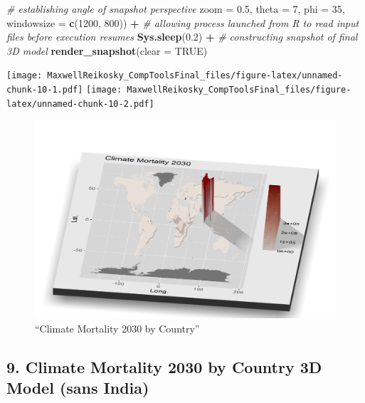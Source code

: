 \documentclass[
]{article}
\newenvironment{Shaded}{\begin{snugshade}}{\end{snugshade}}
\newcommand{\CommentTok}[1]{\textcolor[rgb]{0.56,0.35,0.01}{\textit{#1}}}
\newcommand{\DataTypeTok}[1]{\textcolor[rgb]{0.13,0.29,0.53}{#1}}
\newcommand{\DecValTok}[1]{\textcolor[rgb]{0.00,0.00,0.81}{#1}}
\newcommand{\FloatTok}[1]{\textcolor[rgb]{0.00,0.00,0.81}{#1}}
\newcommand{\KeywordTok}[1]{\textcolor[rgb]{0.13,0.29,0.53}{\textbf{#1}}}
\newcommand{\NormalTok}[1]{#1}
\newcommand{\OperatorTok}[1]{\textcolor[rgb]{0.81,0.36,0.00}{\textbf{#1}}}
\newcommand{\OtherTok}[1]{\textcolor[rgb]{0.56,0.35,0.01}{#1}}
\newcommand{\StringTok}[1]{\textcolor[rgb]{0.31,0.60,0.02}{#1}}
\begin{document}
\begin{Shaded}
\begin{Highlighting}[]
\CommentTok{# establishing angle of snapshot perspective                                           }
    \DataTypeTok{zoom =} \FloatTok{0.5}\NormalTok{, }\DataTypeTok{theta =} \DecValTok{7}\NormalTok{, }\DataTypeTok{phi =} \DecValTok{35}\NormalTok{, }\DataTypeTok{windowsize =} \KeywordTok{c}\NormalTok{(}\DecValTok{1200}\NormalTok{, }\DecValTok{800}\NormalTok{)) }\OperatorTok{+}\StringTok{ }
\StringTok{  }
\CommentTok{# allowing process launched from R to read input files before execution resumes}
\StringTok{  }\KeywordTok{Sys.sleep}\NormalTok{(}\FloatTok{0.2}\NormalTok{) }\OperatorTok{+}\StringTok{ }
\StringTok{  }
\CommentTok{# constructing snapshot of final 3D model}
\StringTok{  }\KeywordTok{render_snapshot}\NormalTok{(}\DataTypeTok{clear =} \OtherTok{TRUE}\NormalTok{) }
\end{Highlighting}
\end{Shaded}

\texttt{[image: MaxwellReikosky\_CompToolsFinal\_files/figure-latex/unnamed-chunk-10-1.pdf]}
\texttt{[image: MaxwellReikosky\_CompToolsFinal\_files/figure-latex/unnamed-chunk-10-2.pdf]}

\newpage

\begin{figure}
\centering
\includegraphics{Results/climmort.png}
\caption{``Climate Mortality 2030 by Country''}
\end{figure}

\newpage

\hypertarget{climate-mortality-2030-by-country-3d-model-sans-india}{%
\subsection{9. Climate Mortality 2030 by Country 3D Model (sans
India)}\label{climate-mortality-2030-by-country-3d-model-sans-india}}
\end{document}
